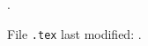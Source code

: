 \documentclass{article}
\begin{document}
\DTMnow.

File \texttt{\jobname.tex} last modified: .
\end{document}

